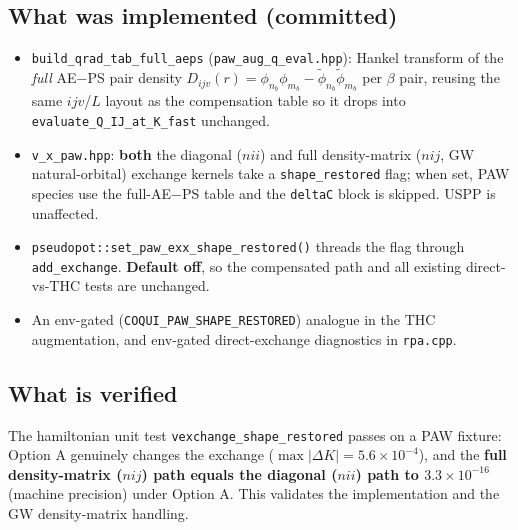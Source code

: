 \documentclass[11pt]{article}
\newcommand{\code}[1]{\texttt{\small #1}}
\begin{document}
\subsection*{What was implemented (committed)}
\begin{itemize}[leftmargin=1.4em]
  \item \code{build\_qrad\_tab\_full\_aeps} (\code{paw\_aug\_q\_eval.hpp}): Hankel
    transform of the \emph{full} AE$-$PS pair density
    $D_{ijv}(r)=\phi_{n_b}\phi_{m_b}-\tilde\phi_{n_b}\tilde\phi_{m_b}$ per $\beta$
    pair, reusing the same $ijv$/$L$ layout as the compensation table so it drops
    into \code{evaluate\_Q\_IJ\_at\_K\_fast} unchanged.
  \item \code{v\_x\_paw.hpp}: \textbf{both} the diagonal ($nii$) and full
    density-matrix ($nij$, GW natural-orbital) exchange kernels take a
    \code{shape\_restored} flag; when set, PAW species use the full-AE$-$PS table
    and the \code{deltaC} block is skipped. USPP is unaffected.
  \item \code{pseudopot::set\_paw\_exx\_shape\_restored()} threads the flag through
    \code{add\_exchange}. \textbf{Default off}, so the compensated path and all
    existing direct-vs-THC tests are unchanged.
  \item An env-gated (\code{COQUI\_PAW\_SHAPE\_RESTORED}) analogue in the THC
    augmentation, and env-gated direct-exchange diagnostics in \code{rpa.cpp}.
\end{itemize}

\subsection*{What is verified}
The hamiltonian unit test \code{vexchange\_shape\_restored} passes on a PAW fixture:
Option A genuinely changes the exchange ($\max|\Delta K| = 5.6\times10^{-4}$), and
the \textbf{full density-matrix ($nij$) path equals the diagonal ($nii$) path to
$3.3\times10^{-16}$} (machine precision) under Option A. This validates the
implementation and the GW density-matrix handling.
\end{document}
